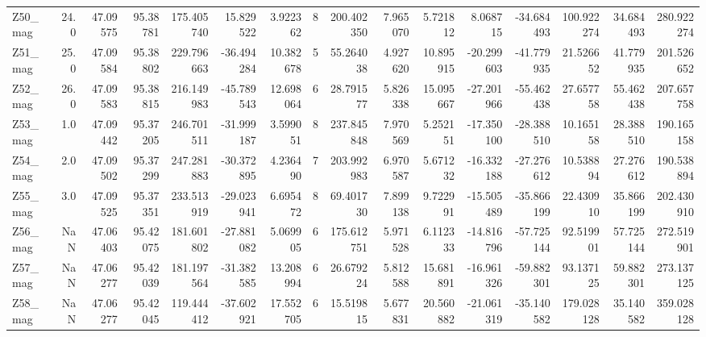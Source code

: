 \documentclass[11pt]{article}
\begin{document}
\begin{sidewaystable}
{\begin{tabular}{lrrrrrrrrrrrrrrr}
Z50\_mag &       24.0 &  47.09575 &  95.38781 &  175.405740 &  15.829522 &   3.922362 &   8 &  200.402350 &  7.965070 &   5.721812 &       8.068715 & -34.684493 &  100.922274 &    34.684493 &   280.922274 \\
Z51\_mag &       25.0 &  47.09584 &  95.38802 &  229.796663 & -36.494284 &  10.382678 &   5 &   55.264038 &  4.927620 &  10.895915 &     -20.299603 & -41.779935 &   21.526652 &    41.779935 &   201.526652 \\
Z52\_mag &       26.0 &  47.09583 &  95.38815 &  216.149983 & -45.789543 &  12.698064 &   6 &   28.791577 &  5.826338 &  15.095667 &     -27.201966 & -55.462438 &   27.657758 &    55.462438 &   207.657758 \\
Z53\_mag &        1.0 &  47.09442 &  95.37205 &  246.701511 & -31.999187 &   3.599051 &   8 &  237.845848 &  7.970569 &   5.252151 &     -17.350100 & -28.388510 &   10.165158 &    28.388510 &   190.165158 \\
Z54\_mag &        2.0 &  47.09502 &  95.37299 &  247.281883 & -30.372895 &   4.236490 &   7 &  203.992983 &  6.970587 &   5.671232 &     -16.332188 & -27.276612 &   10.538894 &    27.276612 &   190.538894 \\
Z55\_mag &        3.0 &  47.09525 &  95.37351 &  233.513919 & -29.023941 &   6.695472 &   8 &   69.401730 &  7.899138 &   9.722991 &     -15.505489 & -35.866199 &   22.430910 &    35.866199 &   202.430910 \\
Z56\_mag &        NaN &  47.06403 &  95.42075 &  181.601802 & -27.881082 &   5.069905 &   6 &  175.612751 &  5.971528 &   6.112333 &     -14.816796 & -57.725144 &   92.519901 &    57.725144 &   272.519901 \\
Z57\_mag &        NaN &  47.06277 &  95.42039 &  181.197564 & -31.382585 &  13.208994 &   6 &   26.679224 &  5.812588 &  15.681891 &     -16.961326 & -59.882301 &   93.137125 &    59.882301 &   273.137125 \\
Z58\_mag &        NaN &  47.06277 &  95.42045 &  119.444412 & -37.602921 &  17.552705 &   6 &   15.519815 &  5.677831 &  20.560882 &     -21.061319 & -35.140582 &  179.028128 &    35.140582 &   359.028128 \\
\bottomrule
\end{tabular}}
\end{sidewaystable}
    


    \begin{center}
    \end{center}
    { \hspace*{\fill} \\}
    
\end{document}
